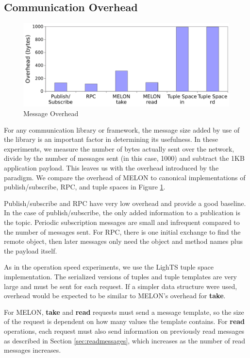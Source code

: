 \subsection{Communication Overhead}

\begin{figure}
\centering
\includegraphics[scale = .50, clip, trim = 0px 0px 0px 0px]{figures/overhead.pdf}
\caption{Message Overhead}
\label{fig:overhead}
\end{figure}

For any communication library or framework, the message size added by use of the library is an important factor in determining its usefulness. In these experiments, we measure the number of bytes actually sent over the network, divide by the number of messages sent (in this case, 1000) and subtract the 1KB application payload. This leaves us with the overhead introduced by the paradigm. We compare the overhead of MELON to canonical implementations of publish/subscribe, RPC, and tuple spaces in Figure \ref{fig:overhead}.

Publish/subscribe and RPC have very low overhead and provide a good baseline. In the case of publish/subscribe, the only added information to a publication is the topic. Periodic subscription messages are small and infrequent compared to the number of messages sent. For RPC, there is one initial exchange to find the remote object, then later messages only need the object and method names plus the payload itself.

As in the operation speed experiments, we use the LighTS tuple space implementation. The serialized versions of tuples and tuple templates are very large and must be sent for each request. If a simpler data structure were used, overhead would be expected to be similar to MELON's overhead for \textbf{take}.

For MELON, \textbf{take} and \textbf{read} requests must send a message template, so the size of the request is dependent on how many values the template contains. For \textbf{read} operations, each request must also send information on previously read messages as described in Section \ref{sec:readmessages}, which increases as the number of read messages increases.

